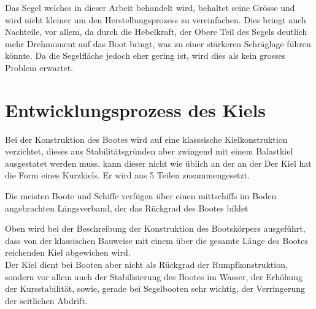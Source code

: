Das Segel welches in dieser Arbeit behandelt wird, behaltet seine Grösse und wird nicht kleiner um den Herstellungsprozess zu vereinfachen. Dies bringt auch Nachteile, vor allem, da durch die Hebelkraft, der Obere Teil des Segels deutlich mehr Drehmoment auf das Boot bringt, was zu einer stärkeren Schräglage führen könnte. Da die Segelfläche jedoch eher gering ist, wird dies als kein grosses Problem erwartet.

\section{Entwicklungsprozess des Kiels}

Bei der  Konstruktion des Bootes wird auf eine klasssische Kielkonstruktion verzichtet, dieses aus Stabilitätsgründen aber zwingend mit einem Balastkiel ausgestatet werden muss, kann dieser nicht wie üblich an der an der Der Kiel hat die Form eines Kurzkiels. Er  wird aus  5  Teilen zusammengesetzt. 


Die meisten Boote und Schiffe verfügen über einen mittschiffs im Boden angebrachten Längsverband, der das Rückgrad des Bootes bildet


Oben wird bei der Beschreibung der Konstruktion des Bootskörpers ausgeführt, dass von der klassischen Bauweise mit einem über die gesamte Länge des Bootes reichenden Kiel abgewichen wird.\\
Der Kiel dient bei Booten aber nicht als Rückgrad der Rumpfkonstruktion, sondern vor allem auch der Stabilisierung des Bootes im Wasser, der Erhöhung der Kursstabilität, sowie, gerade bei Segelbooten sehr wichtig, der Verringerung der seitlichen Abdrift. \\



